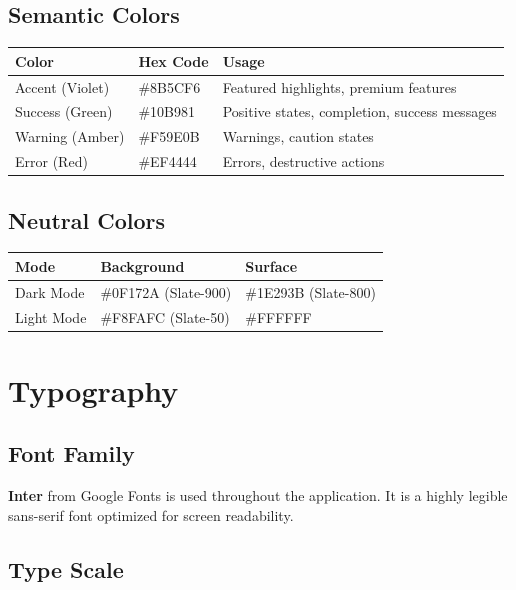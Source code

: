 \documentclass{report}
\begin{document}
\subsection{Semantic Colors}
\begin{table}[h]
\centering
\begin{tabular}{|l|l|l|}
\hline
\textbf{Color} & \textbf{Hex Code} & \textbf{Usage} \\
\hline
Accent (Violet) & \#8B5CF6 & Featured highlights, premium features \\
\hline
Success (Green) & \#10B981 & Positive states, completion, success messages \\
\hline
Warning (Amber) & \#F59E0B & Warnings, caution states \\
\hline
Error (Red) & \#EF4444 & Errors, destructive actions \\
\hline
\end{tabular}
\end{table}

\subsection{Neutral Colors}
\begin{table}[h]
\centering
\begin{tabular}{|l|l|l|}
\hline
\textbf{Mode} & \textbf{Background} & \textbf{Surface} \\
\hline
Dark Mode & \#0F172A (Slate-900) & \#1E293B (Slate-800) \\
\hline
Light Mode & \#F8FAFC (Slate-50) & \#FFFFFF \\
\hline
\end{tabular}
\end{table}

\section{Typography}

\subsection{Font Family}
\textbf{Inter} from Google Fonts is used throughout the application. It is a highly legible sans-serif font optimized for screen readability.

\subsection{Type Scale}
\end{document}

